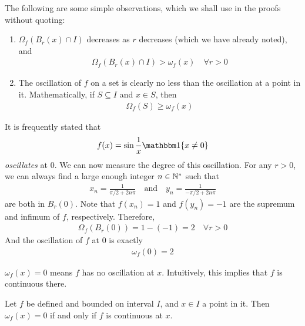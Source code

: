 \documentclass[thmcnt=section, 12pt]{my-elegantbook}
\begin{document}
The following are some simple observations,
which we shall use in the proofs without quoting:
\begin{enumerate}
	\item $\Omega_f(B_r(x) \cap I)$ decreases as $r$ decreases 
		(which we have already noted), 
		and  
		\begin{align*}
			\Omega_f(B_r(x) \cap I) > \omega_f(x)
			\quad \forall r > 0
		\end{align*}
	\item The oscillation of $f$ on a set is clearly no less than
		the oscillation at a point in it.
		Mathematically, if $S \subseteq I$ and $x \in S$, then 
		\begin{align*}
			\Omega_f(S) \geq \omega_f(x)
		\end{align*}
\end{enumerate}

\begin{example} \label{eg:16}
	It is frequently stated that
	\begin{align*}
		f(x) = \sin \frac{1}{x} \ind\{x \neq 0\}
	\end{align*}
	\textit{oscillates} at $0$.
	We can now measure the degree of this oscillation.
	For any $r > 0$,
	we can always find a large enough integer $n \in \mathbb{N}^\ast$
	such that 
	\begin{align*}
		x_n = \frac{1}{\pi / 2 + 2n\pi}
		\quad \text{and} \quad 
		y_n = \frac{1}{-\pi / 2 + 2n\pi}
	\end{align*}
	are both in $B_r(0)$.
	Note that $f(x_n) = 1$ and $f(y_n) = -1$
	are the supremum and infimum of $f$, respectively.
	Therefore, 
	\begin{align*}
		\Omega_f(B_r(0)) = 1 - (-1) = 2
		\quad \forall r > 0
	\end{align*}
	And the oscillation of $f$ at $0$ is exactly
	\begin{align*}
		\omega_f(0) = 2
	\end{align*}
\end{example}


$\omega_f(x) = 0$ means $f$ has no oscillation at $x$.
Intuitively, this implies that $f$ is continuous there.

\begin{theorem} \label{thm:90}
	Let $f$ be defined and bounded on interval $I$,
	and $x \in I$ a point in it.
	Then $\omega_f(x) = 0$ if and only if $f$
	is continuous at $x$.
\end{theorem}
\end{document}

